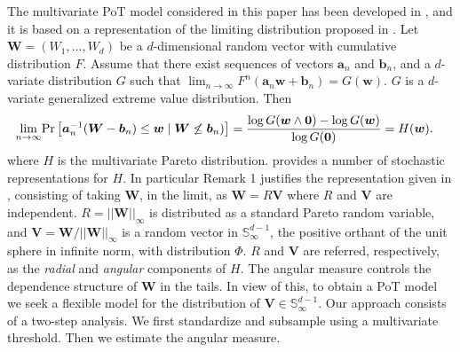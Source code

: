 The multivariate PoT model considered in this paper has been developed in \cite{trubey:pg},
    and it is based on a representation of the limiting distribution proposed in \cite{RoSeWa2018a}.
    Let $\bm{W} = (W_1, \ldots ,W_d)$ be a $d$-dimensional random vector with
    cumulative distribution $F$. Assume 
    that there exist sequences of vectors $\bm{a}_n$ and $\bm{b}_n$,
    and a $d$-variate distribution $G$ such that 
    $\lim_{n\rightarrow\infty} F^n(\bm{a}_n \bm{w} + \bm{b}_n) = 
    G(\bm{w})$. $G$ is a $d$-variate generalized extreme value 
    distribution. Then
    \begin{equation*}
        \begin{aligned}
            \lim\limits_{n\rightarrow\infty} &\text{Pr}\left[\bm{a}^{-1}_n (\bm{W} - \bm{b}_n) 
                \leq \bm{w} \mid \bm{W} \not\leq \bm{b}_n)\right]  
                = \frac{\log G(\bm{w} \wedge \bm{0}) 
                - \log G(\bm{w}) }{\log G(\bm{0})} = H(\bm{w}).
        \end{aligned}
    \end{equation*}
    where $H$ is the multivariate Pareto distribution. \cite{RoSeWa2018a}
    provides a number of stochastic representations for $H$. In particular
    Remark 1 justifies the representation given in \cite{ferreira2014},
    consisting of taking $\bm{W}$, in the limit, as $\bm{W} = R\bm{V}$ 
    where $R$ and $\bm{V}$ are independent. $R = ||\bm{W}||_\infty$ is 
    distributed as a standard Pareto  random variable, and
    $\bm{V} = \bm{W}/||\bm{W}||_\infty$ is a random vector in  
    $\mathbb{S}_{\infty}^{d-1}$, the positive orthant of the 
    unit  sphere in infinite norm, with distribution $\Phi$. 
    $R$ and $\bm{V}$ are referred, respectively, as the {\em radial} 
    and {\em angular}  components of $H$. The angular measure controls 
    the dependence  structure of $\bm{W}$  in the tails. In view of 
    this, to obtain a  PoT model we seek a flexible model for the 
    distribution of $\bm{V} \in {\mathbb S}_{\infty}^{d-1}$. Our approach
    consists of a two-step analysis. We first standardize and subsample using
    a multivariate threshold. Then we estimate the angular measure.

